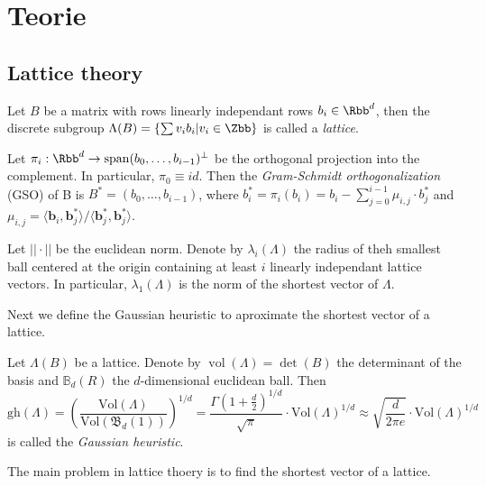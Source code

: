 \chapter{Teorie}

\section{Lattice theory}

\begin{definition}
    Let $B$ be a matrix with rows linearly independant rows $b_i \in \Rbb^d$, then the discrete subgroup $\Lambda(B) = \{\sum v_i b_i | v_i \in \Zbb\}$ is called a \textit{lattice}.   
\end{definition}

Let $\pi_i : \Rbb^d \to \operatorname{span}(b_0, \ldots, b_{i-1})^\perp$ be the orthogonal projection into the complement. In particular, $\pi_0 \equiv id$. Then the \textit{Gram-Schmidt orthogonalization} (GSO) of B is $B^* = (b_0, \ldots, b_{i-1})$, where $b^*_i = \pi_i(b_i) = b_i - \sum_{j=0}^{i-1} \mu_{i,j} \cdot b_j^*$ and $\mu_{i,j} = \langle \boldsymbol{b}_i, \boldsymbol{b}_j^* \rangle / \langle \boldsymbol{b}_j^*, \boldsymbol{b}_j^* \rangle$. 

Let $|| \cdot ||$ be the euclidean norm. Denote by $\lambda_i(\Lambda)$ the radius of theh smallest ball centered at the origin containing at least $i$ linearly independant lattice vectors. In particular, $\lambda_1(\Lambda)$ is the norm of the shortest vector of $\Lambda$.

Next we define the Gaussian heuristic to aproximate the shortest vector of a lattice.

\begin{definition}
    Let $\Lambda(B)$ be a lattice. Denote by $\operatorname*{vol}(\Lambda) = \operatorname*{det}(B)$ the determinant of the basis and $\mathbb{B}_d(R)$ the $d$-dimensional euclidean ball. Then 
    \begin{equation*}
        \mathrm{gh}(\Lambda) = \left(\frac{\mathrm{Vol}(\Lambda)}{\mathrm{Vol}(\mathfrak{B}_d(1))}\right)^{1/d} = \frac{\Gamma\left(1+\frac{d}{2}\right)^{1/d}}{\sqrt{\pi}} \cdot \mathrm{Vol}(\Lambda)^{1/d} \approx \sqrt{\frac{d}{2\pi e}} \cdot \mathrm{Vol}(\Lambda)^{1/d}
    \end{equation*}
    is called the \textit{Gaussian heuristic}.
\end{definition}

The main problem in lattice thoery is to find the shortest vector of a lattice.

